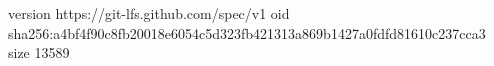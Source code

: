 version https://git-lfs.github.com/spec/v1
oid sha256:a4bf4f90c8fb20018e6054c5d323fb421313a869b1427a0fdfd81610c237cca3
size 13589
